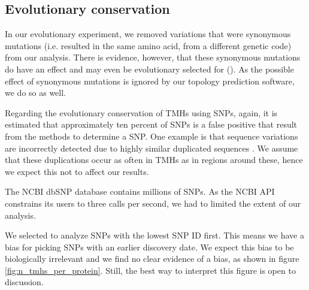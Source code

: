 \subsection{Evolutionary conservation}

%
In our evolutionary experiment, 
we removed variations that were synonymous mutations (i.e.
resulted in the same amino acid, from a different genetic code) 
from our analysis.
There is evidence, however, that these synonymous mutations
do have an effect and may even be evolutionary selected 
for (\cite{hunt2009silent}).
As the possible effect of synonymous mutations is ignored by our
topology prediction software, we do so as well.

%
Regarding the evolutionary conservation of TMHs using SNPs,
again, it is estimated that approximately ten percent
of SNPs is a false positive that result from the methods to determine
a SNP. One example is that sequence variations are incorrectly
detected due to highly similar duplicated sequences \cite{musumeci2010single}.
We assume that these duplications occur as often in TMHs as in
regions around these, hence we expect this not to affect our results.


The NCBI dbSNP database contains millions of SNPs.
As the NCBI API constrains its users to three calls per second,
we had to limited the extent of our analysis.

%
We selected to analyze SNPs with the lowest SNP ID first.
This means we have a bias for picking SNPs with
an earlier discovery date.
We expect this bias to be biologically irrelevant
and we find no clear evidence of a bias, as
shown in figure \ref{fig:n_tmhs_per_protein}.
Still, the best way to interpret this figure
is open to discussion.

